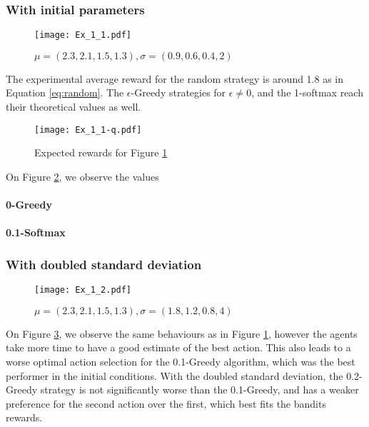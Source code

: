 \documentclass[a4paper,11pt]{article}
\begin{document}
\subsubsection{With initial parameters}
\begin{figure}[H]
  \center
  \texttt{[image: Ex\_1\_1.pdf]}
  \caption{\label{fig:1.1} $\mu = (2.3, 2.1, 1.5, 1.3), \sigma = (0.9, 0.6, 0.4, 2)$}
\end{figure}

The experimental average reward for the random strategy is around 1.8 as in Equation \ref{eq:random}. The $\epsilon$-Greedy strategies for $\epsilon \neq 0$, and the 1-softmax reach their theoretical values as well.

\begin{figure}[H]
  \center
  \texttt{[image: Ex\_1\_1-q.pdf]}
  \caption{\label{fig:1.1q} Expected rewards for Figure \ref{fig:1.1}}
\end{figure}

On Figure \ref{fig:1.1q}, we observe the values 

\paragraph{0-Greedy}

\paragraph{0.1-Softmax}

\subsubsection{With doubled standard deviation}
\begin{figure}[H]
  \center
  \texttt{[image: Ex\_1\_2.pdf]}
  \caption{\label{fig:1.2} $\mu = (2.3, 2.1, 1.5, 1.3), \sigma = (1.8, 1.2, 0.8, 4)$}
\end{figure}

On Figure \ref{fig:1.2}, we observe the same behaviours as in Figure \ref{fig:1.1}, however the agents take more time to have a good estimate of the best action. This also leads to a worse optimal action selection for the 0.1-Greedy algorithm, which was the best performer in the initial conditions. With the doubled standard deviation, the 0.2-Greedy strategy is not significantly worse than the 0.1-Greedy, and has a weaker preference for the second action over the first, which best fits the bandits rewards.
\end{document}
